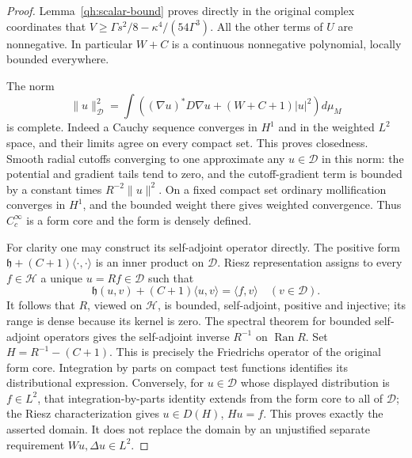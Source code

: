 \begin{proof}
Lemma~\ref{qh:scalar-bound} proves directly in the original complex
coordinates that $V\geq\Gamma s^2/8-\kappa^4/(54\Gamma^3)$.
All the other terms of \(U\) are nonnegative. In particular \(W+C\)
is a continuous nonnegative polynomial, locally bounded everywhere.

The norm
\[
 \|u\|_{\mathscr D}^2
  =\int\left((\nabla u)^*D\nabla u+(W+C+1)|u|^2\right)d\mu_M
\]
is complete. Indeed a Cauchy sequence converges in \(H^1\) and in the
weighted \(L^2\) space, and their limits agree on every compact set.
This proves closedness. Smooth radial cutoffs converging to one
approximate any \(u\in\mathscr D\) in this norm: the potential and
gradient tails tend to zero, and the cutoff-gradient term is bounded
by a constant times \(R^{-2}\|u\|^2\). On a fixed compact set ordinary
mollification converges in \(H^1\), and the bounded weight there gives
weighted convergence. Thus \(C_c^\infty\) is a form core and the
form is densely defined.

For clarity one may construct its self-adjoint operator directly.
The positive form \(\mathfrak h+(C+1)\langle\cdot,\cdot\rangle\)
is an inner product on \(\mathscr D\). Riesz representation assigns
to every \(f\in\mathscr H\) a unique \(u=Rf\in\mathscr D\) such that
\[
 \mathfrak h(u,v)+(C+1)\langle u,v\rangle=\langle f,v\rangle
                  \quad(v\in\mathscr D).
\]
It follows that \(R\), viewed on \(\mathscr H\), is bounded,
self-adjoint, positive and injective; its range is dense because
its kernel is zero. The spectral theorem for bounded self-adjoint
operators gives the self-adjoint inverse \(R^{-1}\) on
\(\operatorname{Ran}R\). Set \(H=R^{-1}-(C+1)\).
This is precisely the Friedrichs operator of the original form core.
Integration by parts on compact test functions identifies its
distributional expression. Conversely, for \(u\in\mathscr D\) whose
displayed distribution is \(f\in L^2\), that integration-by-parts
identity extends from the form core to all of \(\mathscr D\);
the Riesz characterization gives \(u\in D(H)\), \(Hu=f\).
This proves exactly the asserted domain. It does not replace the
domain by an unjustified separate requirement \(Wu,\Delta u\in L^2\).
\end{proof}

